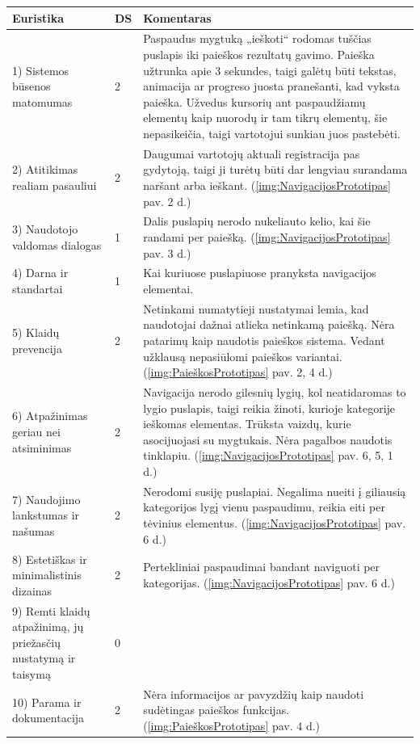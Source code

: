 \documentclass{VUMIFPSbakalaurinis}
\begin{document}
\begin{center}
\begin{tabular}{ | p{} | p{} | p{} | } 
 \hline
	Euristika & DS & Komentaras \\ \hline
	1) Sistemos būsenos matomumas & 2 & Paspaudus mygtuką „ieškoti“ rodomas tuščias puslapis iki paieškos rezultatų gavimo. Paieška užtrunka apie 3 sekundes, taigi galėtų būti tekstas, animacija ar progreso juosta pranešanti, kad vyksta paieška. Užvedus kursorių ant paspaudžiamų elementų kaip nuorodų ir tam tikrų elementų, šie nepasikeičia, taigi vartotojui sunkiau juos pastebėti. \\ \hline
	2) Atitikimas realiam pasauliui  & 2 & Daugumai vartotojų aktuali registracija pas gydytoją, taigi ji turėtų būti dar lengviau surandama naršant arba ieškant. (\ref{img:NavigacijosPrototipas} pav. 2 d.) \\ \hline
	3) Naudotojo valdomas dialogas & 1 & Dalis puslapių nerodo nukeliauto kelio, kai šie randami per paiešką. (\ref{img:NavigacijosPrototipas} pav. 3 d.) \\ \hline
	4) Darna ir standartai & 1 & Kai kuriuose puslapiuose pranyksta navigacijos elementai. \\ \hline
	5) Klaidų prevencija & 2 & Netinkami numatytieji nustatymai lemia, kad naudotojai dažnai atlieka netinkamą paiešką. Nėra patarimų kaip naudotis paieškos sistema. Vedant užklausą nepasiūlomi paieškos variantai. (\ref{img:PaieškosPrototipas} pav. 2, 4 d.) \\ \hline
	6) Atpažinimas geriau nei atsiminimas & 2 & Navigacija nerodo gilesnių lygių, kol neatidaromas to lygio puslapis, taigi reikia žinoti, kurioje kategorije ieškomas elementas. Trūksta vaizdų, kurie asocijuojasi su mygtukais. Nėra pagalbos naudotis tinklapiu. (\ref{img:NavigacijosPrototipas} pav. 6, 5, 1 d.) \\ \hline
	7) Naudojimo lankstumas ir našumas & 2 & Nerodomi susiję puslapiai. Negalima nueiti į giliausią kategorijos lygį vienu paspaudimu, reikia eiti per tėvinius elementus. (\ref{img:NavigacijosPrototipas} pav. 6 d.) \\ \hline
	8) Estetiškas ir minimalistinis dizainas & 2 & Pertekliniai paspaudimai bandant naviguoti per kategorijas. (\ref{img:NavigacijosPrototipas} pav. 6 d.) \\ \hline
	9) Remti klaidų atpažinimą, jų priežasčių nustatymą ir taisymą & 0 &  \\ \hline
	10) Parama ir dokumentacija & 2 & Nėra informacijos ar pavyzdžių kaip naudoti sudėtingas paieškos funkcijas. (\ref{img:PaieškosPrototipas} pav. 4 d.) \\ \hline
\end{tabular}
\label{EuristikųLentelėPrad}
\end{center}
\end{document}

